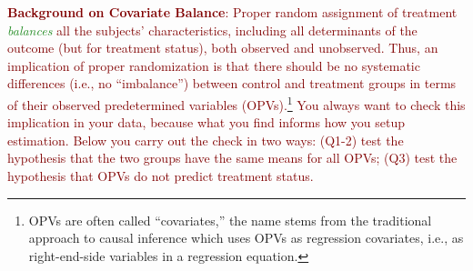 \documentclass{article}
\begin{document}
\noindent \textcolor{Maroon}{\textbf{Background on Covariate Balance}: Proper random assignment of treatment \textcolor{ForestGreen}{\textit{balances}} all the subjects' characteristics, including all determinants of the outcome (but for treatment status), both observed and unobserved. Thus, an implication of proper randomization is that there should be no systematic differences (i.e., no ``imbalance'') between control and treatment groups in terms of their observed predetermined variables (OPVs).\footnote{OPVs are often called ``covariates,'' the name stems from the traditional approach to causal inference which uses OPVs as regression covariates, i.e., as right-end-side variables in a regression equation.} You always want to check this implication in your data, because what you find informs how you setup estimation. Below you carry out the check in two ways: (Q1-2) test the hypothesis that the two groups have the same means for all OPVs; (Q3) test the hypothesis that OPVs do not predict treatment status.}
\end{document}
